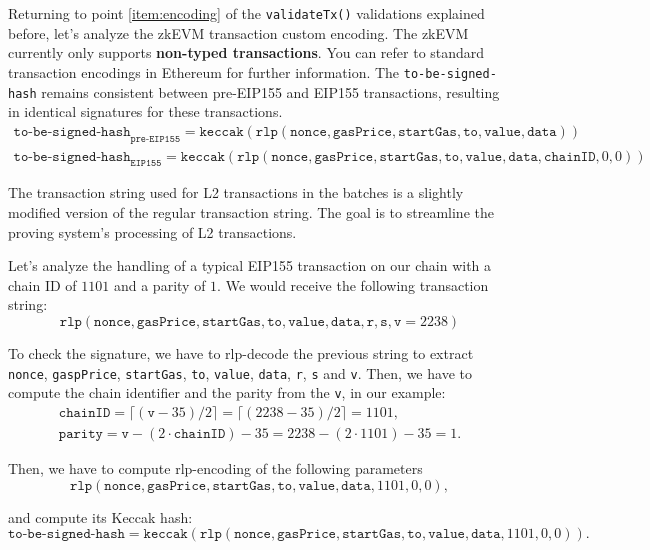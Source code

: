 Returning to point \ref{item:encoding} of the \texttt{validateTx()} validations explained before, let's analyze the zkEVM transaction custom encoding. The zkEVM currently only supports \textbf{non-typed transactions}. You can refer to standard transaction encodings in Ethereum for further information. The \texttt{to-be-signed-hash} remains consistent between pre-EIP155 and EIP155 transactions, resulting in identical signatures for these transactions.
\small
\begin{gather*}
\texttt{to-be-signed-hash}_{\texttt{pre-EIP155}} = \texttt{keccak}(\texttt{rlp}(\texttt{nonce}, \texttt{gasPrice}, \texttt{startGas}, \texttt{to}, \texttt{value}, \texttt{data}))\\
\texttt{to-be-signed-hash}_{\texttt{EIP155}} = \texttt{keccak}(\texttt{rlp}(\texttt{nonce}, \texttt{gasPrice}, \texttt{startGas}, \texttt{to}, \texttt{value}, \texttt{data}, \texttt{chainID}, 0, 0))
\end{gather*}
\normalsize

The transaction string used for L2 transactions in the batches is a slightly modified version of the regular transaction string. The goal is to streamline the proving system's processing of L2 transactions.

Let's analyze the handling of a typical EIP155 transaction on our chain with a chain ID of $1101$ and a parity of $1$. We would receive the following transaction string:
\[
\texttt{rlp}(\texttt{nonce}, \texttt{gasPrice}, \texttt{startGas}, \texttt{to}, \texttt{value}, \texttt{data}, \texttt{r}, \texttt{s}, \texttt{v}=2238)
\]

To check the signature, we have to rlp-decode the previous string to extract \texttt{nonce}, \texttt{gaspPrice}, \texttt{startGas}, \texttt{to}, \texttt{value}, \texttt{data}, \texttt{r}, \texttt{s} and \texttt{v}. Then, we have to compute the chain identifier and the parity from the \texttt{v}, in our example:
\begin{gather*}
\texttt{chainID} = \lceil (\texttt{v}-35)/2 \rceil = \lceil (2238-35)/2 \rceil = 1101, \\
\texttt{parity}=\texttt{v}-(2 \cdot \texttt{chainID})-35 = 2238-(2 \cdot 1101)-35 = 1.
\end{gather*}

Then, we have to compute rlp-encoding of the following parameters
\[
\texttt{rlp}(\texttt{nonce}, \texttt{gasPrice}, \texttt{startGas}, \texttt{to}, \texttt{value}, \texttt{data}, 1101, 0, 0),
\]

and compute its Keccak hash:
\[
\texttt{to-be-signed-hash} = \texttt{keccak}(\texttt{rlp}(\texttt{nonce}, \texttt{gasPrice}, \texttt{startGas}, \texttt{to}, \texttt{value}, \texttt{data}, 1101, 0, 0)).
\]

